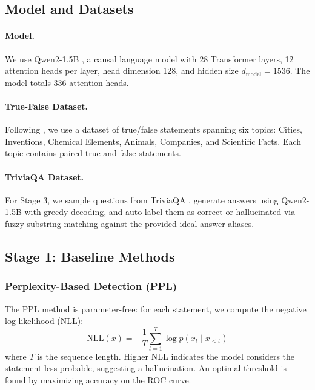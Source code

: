 \documentclass[11pt]{article}
\begin{document}
\subsection{Model and Datasets}
\label{sec:setup}

\paragraph{Model.} We use Qwen2-1.5B \citep{qwen2024qwen2}, a causal language model with 28 Transformer layers, 12 attention heads per layer, head dimension 128, and hidden size $d_{\text{model}} = 1536$. The model totals 336 attention heads.

\paragraph{True-False Dataset.} Following \citet{azaria2023internal}, we use a dataset of true/false statements spanning six topics: Cities, Inventions, Chemical Elements, Animals, Companies, and Scientific Facts. Each topic contains paired true and false statements.

\paragraph{TriviaQA Dataset.} For Stage 3, we sample questions from TriviaQA \citep{joshi2017triviaqa}, generate answers using Qwen2-1.5B with greedy decoding, and auto-label them as correct or hallucinated via fuzzy substring matching against the provided ideal answer aliases.

\subsection{Stage 1: Baseline Methods}
\label{sec:baseline}

\subsubsection{Perplexity-Based Detection (PPL)}

The PPL method is parameter-free: for each statement, we compute the negative log-likelihood (NLL):
\begin{equation}
    \text{NLL}(x) = -\frac{1}{T} \sum_{t=1}^{T} \log p(x_t \mid x_{<t})
\end{equation}
where $T$ is the sequence length. Higher NLL indicates the model considers the statement less probable, suggesting a hallucination. An optimal threshold is found by maximizing accuracy on the ROC curve.
\end{document}
